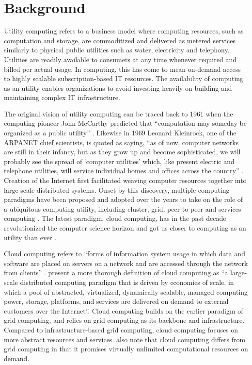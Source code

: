 \section{Background} \label{sec:background}

Utility computing refers to a business model where computing resources, such as computation and storage, are commoditized and delivered as metered services similarly to physical public utilities such as water, electricity and telephony. Utilities are readily available to consumers at any time whenever required and billed per actual usage. In computing, this has come to mean on-demand access to highly scalable subscription-based IT resources. The availability of computing as an utility enables organizations to avoid investing heavily on building and maintaining complex IT infrastructure. \parencite{buyya09cloud}

The original vision of utility computing can be traced back to 1961 when the computing pioneer John McCarthy predicted that ``computation may someday be organized as a public utility'' \parencite{foster08cloudGrid}. Likewise in 1969 Leonard Kleinrock, one of the ARPANET chief scientists, is quoted as saying, ``as of now, computer networks are still in their infancy, but as they grow up and become sophisticated, we will probably see the spread of ‘computer utilities’ which, like present electric and telephone utilities, will service individual homes and offices across the country'' \parencite{kleinrock03internet}. Creation of the Internet first facilitated weaving computer resources together into large-scale distributed systems. Onset by this discovery, multiple computing paradigms have been proposed and adopted over the years to take on the role of a ubiquitous computing utility, including cluster, grid, peer-to-peer and services computing \parencite{buyya09cloud}. The latest paradigm, cloud computing, has in the past decade revolutionized the computer science horizon and got us closer to computing as an utility than ever \parencite{buyya2017manifesto}.

Cloud computing refers to ``forms of information system usage in which data and software are placed on servers on a network and are accessed through the network from clients'' \parencite{tsuruoka16}.
\textcite{foster08cloudGrid} present a more thorough definition of cloud computing as ``a large-scale distributed computing paradigm that is driven by economies of scale, in which a pool of abstracted, virtualized, dynamically-scalable, managed computing power, storage, platforms, and services are delivered on demand to external customers over the Internet''. Cloud computing builds on the earlier paradigm of grid computing, and relies on grid computing as its backbone and infrastructure. Compared to infrastructure-based grid computing, cloud computing focuses on more abstract resources and services. \textcite{buyya2017manifesto} also note that cloud computing differs from grid computing in that it promises virtually unlimited computational resources on demand.

